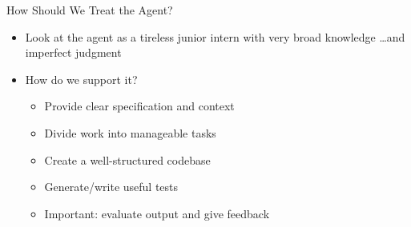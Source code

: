 \documentclass[
ps,
]{prosper}
\begin{document}
\begin{slide}{How Should We Treat the Agent?}

\begin{itemize}

\item Look at the agent as a tireless junior intern with very broad knowledge
  \dots and imperfect judgment

\item How do we support it?

  \begin{itemize}
    
  \item Provide clear specification and context

  \item Divide work into manageable tasks

  \item Create a well-structured codebase

  \item Generate/write useful tests

  \item Important: evaluate output and give feedback
    
  \end{itemize}

\end{itemize}
  
\end{slide}
\end{document}
